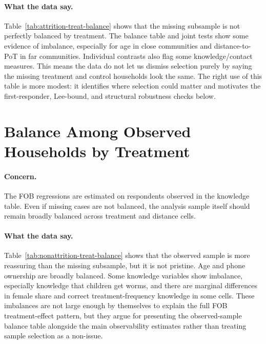 \documentclass[11pt]{article}
\begin{document}
\begin{table}[!htbp]
\centering
\caption{Covariate balance among knowledge-table-missing households by treatment assignment}
\label{tab:attrition-treat-balance}

\end{table}
\FloatBarrier

\paragraph{What the data say.}
Table~\ref{tab:attrition-treat-balance} shows that the missing subsample is not perfectly balanced by treatment. The balance table and joint tests show some evidence of imbalance, especially for age in close communities and distance-to-PoT in far communities. Individual contrasts also flag some knowledge/contact measures. This means the data do not let us dismiss selection purely by saying the missing treatment and control households look the same. The right use of this table is more modest: it identifies where selection could matter and motivates the first-responder, Lee-bound, and structural robustness checks below.

\section{Balance Among Observed Households by Treatment}

\paragraph{Concern.}
The FOB regressions are estimated on respondents observed in the knowledge table. Even if missing cases are not balanced, the analysis sample itself should remain broadly balanced across treatment and distance cells.

\begin{table}[!htbp]
\centering
\caption{Covariate balance among knowledge-table-observed households by treatment assignment}
\label{tab:nonattrition-treat-balance}

\end{table}
\FloatBarrier

\paragraph{What the data say.}
Table~\ref{tab:nonattrition-treat-balance} shows that the observed sample is more reassuring than the missing subsample, but it is not pristine. Age and phone ownership are broadly balanced. Some knowledge variables show imbalance, especially knowledge that children get worms, and there are marginal differences in female share and correct treatment-frequency knowledge in some cells. These imbalances are not large enough by themselves to explain the full FOB treatment-effect pattern, but they argue for presenting the observed-sample balance table alongside the main observability estimates rather than treating sample selection as a non-issue.
\end{document}
